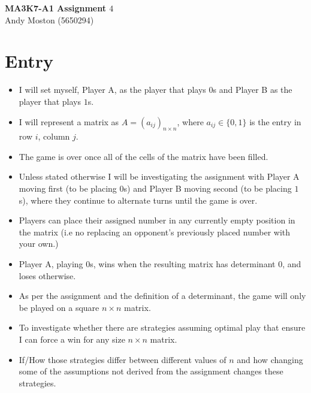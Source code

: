 \documentclass[11pt]{article}
\newcommand{\keywordfont}{\textsc}
\newcommand{\keyword}[1]{%
  \marginpar{\raggedright\small\keywordfont{#1}}}
\begin{document}
\Large
\begin{center}
\textbf{MA3K7-A1 Assignment $4$}\\
Andy Moston (5650294)
\end{center}
\normalsize

\section*{Entry}


\begin{itemize}

\item I will set myself, Player A, as \keyword{Notation} the player that plays $0$s and Player B as the player that plays $1$s.


\item I will represent a matrix as $A=(a_{ij})_{n\times n}$, where $a_{ij}\in \{ 0,1 \}$ is the entry in row $i$, column $j$.

\end{itemize}

\begin{itemize}

\item The game is over once all of the cells of the matrix have been filled.

\item Unless stated \keyword{I Know} otherwise I will be investigating the assignment with Player A moving first (to be placing $0$s) and Player B moving second (to be placing $1$s), where they continue to alternate turns until the game is over.

\item Players can place their assigned number in any currently empty position in the matrix (i.e no replacing an opponent's previously placed number with your own.)

\item Player A, playing $0$s, wins when the resulting matrix has determinant 0, and loses otherwise.

\item As per the assignment and the definition of a determinant, the game will only be played on a square $n \times n$ matrix.


\end{itemize}


\begin{itemize}

\item To investigate whether \keyword{What I Want} there are strategies assuming optimal play that ensure I can force a win for any size $n \times n$ matrix.

\item If/How those strategies differ between different values of $n$ and how changing some of the assumptions not derived from the assignment changes these strategies. 

\end{itemize}
\end{document}
